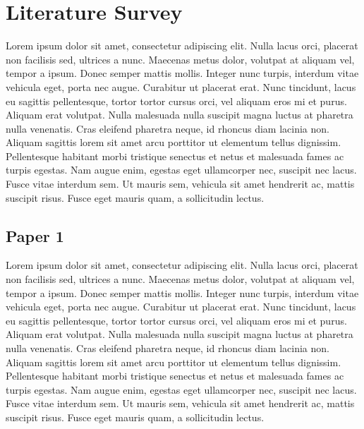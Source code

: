 \documentclass[12pt,a4paper,titlepage]{report}
\begin{document}
\chapter{Literature Survey}
Lorem ipsum dolor sit amet, consectetur adipiscing elit. Nulla lacus orci, placerat non facilisis sed, ultrices a nunc. Maecenas metus dolor, volutpat at aliquam vel, tempor a ipsum. Donec semper mattis mollis. Integer nunc turpis, interdum vitae vehicula eget, porta nec augue. Curabitur ut placerat erat. Nunc tincidunt, lacus eu sagittis pellentesque, tortor tortor cursus orci, vel aliquam eros mi et purus. Aliquam erat volutpat. Nulla malesuada nulla suscipit magna luctus at pharetra nulla venenatis. Cras eleifend pharetra neque, id rhoncus diam lacinia non. Aliquam sagittis lorem sit amet arcu porttitor ut elementum tellus dignissim. Pellentesque habitant morbi tristique senectus et netus et malesuada fames ac turpis egestas. Nam augue enim, egestas eget ullamcorper nec, suscipit nec lacus. Fusce vitae interdum sem. Ut mauris sem, vehicula sit amet hendrerit ac, mattis suscipit risus. Fusce eget mauris quam, a sollicitudin lectus.
\section{Paper 1}
Lorem ipsum dolor sit amet, consectetur adipiscing elit. Nulla lacus orci, placerat non facilisis sed, ultrices a nunc. Maecenas metus dolor, volutpat at aliquam vel, tempor a ipsum. Donec semper mattis mollis. Integer nunc turpis, interdum vitae vehicula eget, porta nec augue. Curabitur ut placerat erat. Nunc tincidunt, lacus eu sagittis pellentesque, tortor tortor cursus orci, vel aliquam eros mi et purus. Aliquam erat volutpat. Nulla malesuada nulla suscipit magna luctus at pharetra nulla venenatis. Cras eleifend pharetra neque, id rhoncus diam lacinia non. Aliquam sagittis lorem sit amet arcu porttitor ut elementum tellus dignissim. Pellentesque habitant morbi tristique senectus et netus et malesuada fames ac turpis egestas. Nam augue enim, egestas eget ullamcorper nec, suscipit nec lacus. Fusce vitae interdum sem. Ut mauris sem, vehicula sit amet hendrerit ac, mattis suscipit risus. Fusce eget mauris quam, a sollicitudin lectus.
\end{document}
